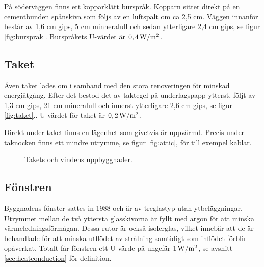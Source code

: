 På söderväggen finns ett kopparklätt burspråk. Kopparn sitter direkt på en cementbunden spånskiva som följs av en luftspalt om ca 2,5 cm. Väggen innanför består av 1,6 cm gips, 5 cm minneralull och sedan ytterligare 2,4 cm gips, se figur \ref{fig:bursprak}.\cite{kandidatarbete2010} Burspråkets U-värdet är $\unit[0,4]{W/m^2}$.

\subsection{Taket}
Även taket lades om i samband med den stora renoveringen för minskad energiåtgång. Efter det bestod det av taktegel på underlagspapp ytterst, följt av 1,3 cm gips, 21 cm mineralull och innerst ytterligare 2,6 cm gips, se figur \ref{fig:taket}.\cite{kandidatarbete2010}. U-värdet för taket är $\unit[0,2]{W/m^2}$.

Direkt under taket finns en lägenhet som givetvis är uppvärmd. Precis under taknocken finns ett mindre utrymme, se figur \ref{fig:attic}, för till exempel kablar.

\begin{figure}[hpbt]
\centering
{}
\caption{\label{fig:roof_attic} Takets och vindens uppbyggnader.}
\end{figure}


\subsection{Fönstren}

Byggnadens fönster sattes in 1988 och är av treglastyp utan ytbeläggningar. Utrymmet mellan de två yttersta glasskivorna är fyllt med argon för att minska värmeledningsförmågan. Dessa rutor är också isolerglas, vilket innebär att de är behandlade för att minska utflödet av strålning samtidigt som inflödet förblir opåverkat.  Totalt får fönstren ett U-värde på ungefär $\unit[1]{W/m^2}$, se avsnitt \ref{sec:heatconduction} för definition. 

